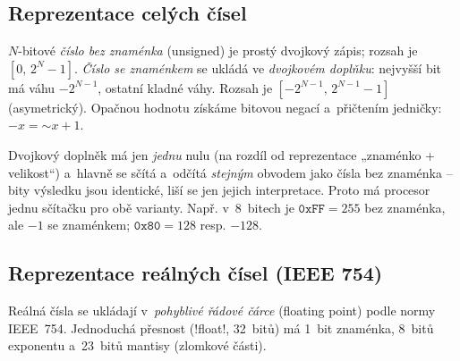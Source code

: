 \subsection{Reprezentace celých čísel}

\begin{definice}
$N$-bitové \emph{číslo bez znaménka} (unsigned) je prostý dvojkový zápis; rozsah je $[0,\,2^{N}-1]$. \emph{Číslo se znaménkem} se ukládá ve \emph{dvojkovém doplňku}: nejvyšší bit má váhu $-2^{N-1}$, ostatní kladné váhy. Rozsah je $[-2^{N-1},\,2^{N-1}-1]$ (asymetrický). Opačnou hodnotu získáme bitovou negací a~přičtením jedničky: $-x=\mathord{\sim}x+1$.
\end{definice}

\begin{intuice}
Dvojkový doplněk má jen \emph{jednu} nulu (na rozdíl od reprezentace „znaménko + velikost``) a~hlavně se sčítá a~odčítá \emph{stejným} obvodem jako čísla bez znaménka -- bity výsledku jsou identické, liší se jen jejich interpretace. Proto má procesor jednu sčítačku pro obě varianty. Např. v~8~bitech je $\texttt{0xFF}=255$ bez znaménka, ale $-1$ se znaménkem; $\texttt{0x80}=128$ resp. $-128$.
\end{intuice}

\subsection{Reprezentace reálných čísel (IEEE 754)}

Reálná čísla se ukládají v~\emph{pohyblivé řádové čárce} (floating point) podle normy IEEE~754. Jednoduchá přesnost (\cd!float!, 32~bitů) má 1~bit znaménka, 8~bitů exponentu a~23~bitů mantisy (zlomkové části).

\begin{center}
%
\end{center}

